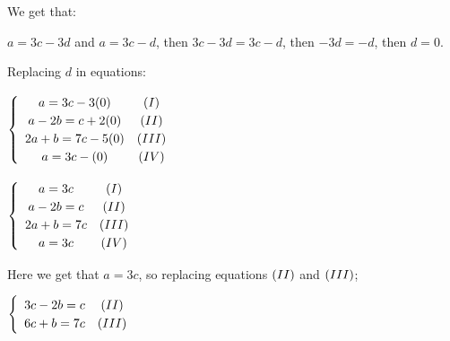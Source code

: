 \singlespacing

We get that:

\singlespacing

$a = 3c-3d$ and $a = 3c-d$, then $3c-3d = 3c-d$, then $-3d = -d$, then $d = 0$.

\singlespacing

Replacing $d$ in equations:

\singlespacing

\begin{math}
    \begin{cases}
        \begin{array}{cc}
            a=3c-3(0)    & (\rom{1}) \\
            a-2b=c+2(0)  & (\rom{2}) \\
            2a+b=7c-5(0) & (\rom{3}) \\
            a=3c-(0)     & (\rom{4})
        \end{array}
    \end{cases}
\end{math}

\singlespacing

\begin{math}
    \begin{cases}
        \begin{array}{cc}
            a=3c    & (\rom{1}) \\
            a-2b=c  & (\rom{2}) \\
            2a+b=7c & (\rom{3}) \\
            a=3c    & (\rom{4})
        \end{array}
    \end{cases}
\end{math}

\singlespacing

Here we get that $a=3c$, so replacing equations $(\rom{2})$ and $(\rom{3})$;

\singlespacing

\begin{math}
    \begin{cases}
        \begin{array}{cc}
            3c-2b=c & (\rom{2}) \\
            6c+b=7c & (\rom{3})
        \end{array}
    \end{cases}
\end{math}

\singlespacing

